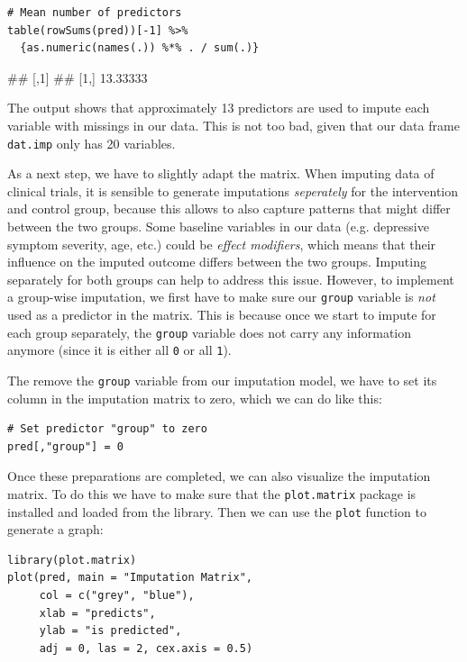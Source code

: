 \begin{lstlisting}
# Mean number of predictors
table(rowSums(pred))[-1] %>%
  {as.numeric(names(.)) %*% . / sum(.)}
\end{lstlisting}

\begin{example}
##          [,1]
## [1,] 13.33333
\end{example}

The output shows that approximately 13 predictors are used to impute each variable with missings in our data. This is not too bad, given that our data frame \texttt{dat.imp} only has 20 variables.

As a next step, we have to slightly adapt the matrix. When imputing data of clinical trials, it is sensible to generate imputations \emph{seperately} for the intervention and control group, because this allows to also capture patterns that might differ between the two groups. Some baseline variables in our data (e.g. depressive symptom severity, age, etc.) could be \emph{effect modifiers}, which means that their influence on the imputed outcome differs between the two groups. Imputing separately for both groups can help to address this issue. However, to implement a group-wise imputation, we first have to make sure our \texttt{group} variable is \emph{not} used as a predictor in the matrix. This is because once we start to impute for each group separately, the \texttt{group} variable does not carry any information anymore (since it is either all \texttt{0} or all \texttt{1}).

The remove the \texttt{group} variable from our imputation model, we have to set its column in the imputation matrix to zero, which we can do like this: 

\begin{lstlisting}
# Set predictor "group" to zero
pred[,"group"] = 0
\end{lstlisting}

Once these preparations are completed, we can also visualize the imputation matrix. To do this we have to make sure that the \texttt{plot.matrix} package is installed and loaded from the library. Then we can use the \texttt{plot} function to generate a graph:

\begin{lstlisting}
library(plot.matrix)
plot(pred, main = "Imputation Matrix",
     col = c("grey", "blue"),
     xlab = "predicts",
     ylab = "is predicted",
     adj = 0, las = 2, cex.axis = 0.5)
\end{lstlisting}

